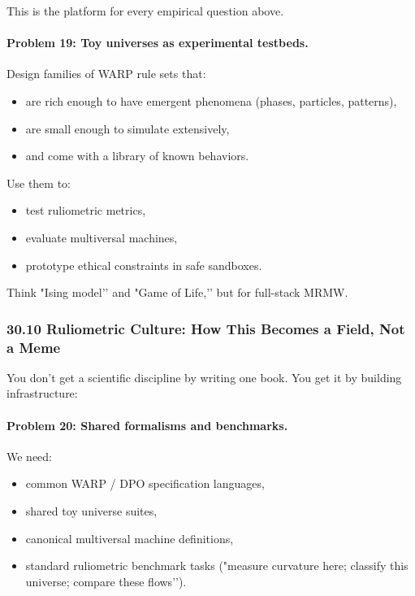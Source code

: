This is the platform for every empirical question above.

\paragraph{Problem 19: Toy universes as experimental testbeds.}

Design families of WARP rule sets that:

\begin{itemize}
  \item are rich enough to have emergent phenomena (phases, particles, patterns),
  \item are small enough to simulate extensively,
  \item and come with a library of known behaviors.
\end{itemize}

Use them to:

\begin{itemize}
  \item test ruliometric metrics,
  \item evaluate multiversal machines,
  \item prototype ethical constraints in safe sandboxes.
\end{itemize}

Think "Ising model’’ and "Game of Life,’’ but for full-stack MRMW.

\subsubsection*{30.10  Ruliometric Culture: How This Becomes a Field, Not a Meme}

You don’t get a scientific discipline by writing one book.
You get it by building infrastructure:

\paragraph{Problem 20: Shared formalisms and benchmarks.}

We need:

\begin{itemize}
  \item common WARP / DPO specification languages,
  \item shared toy universe suites,
  \item canonical multiversal machine definitions,
  \item standard ruliometric benchmark tasks ("measure curvature here; classify this universe; compare these flows’’).
\end{itemize}

